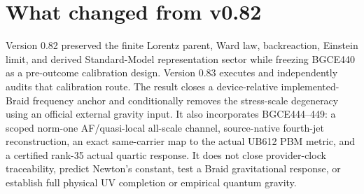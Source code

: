 \documentclass[11pt]{article}
\theoremstyle{definition}
\theoremstyle{remark}
\begin{document}
\section{What changed from v0.82}

Version 0.82 preserved the finite Lorentz parent, Ward law, backreaction, Einstein limit, and derived Standard-Model representation sector while freezing BGCE440 as a pre-outcome calibration design. Version 0.83 executes and independently audits that calibration route. The result closes a device-relative implemented-Braid frequency anchor and conditionally removes the stress-scale degeneracy using an official external gravity input. It also incorporates BGCE444--449: a scoped norm-one AF/quasi-local all-scale channel, source-native fourth-jet reconstruction, an exact same-carrier map to the actual UB612 PBM metric, and a certified rank-35 actual quartic response. It does not close provider-clock traceability, predict Newton's constant, test a Braid gravitational response, or establish full physical UV completion or empirical quantum gravity.
\end{document}
